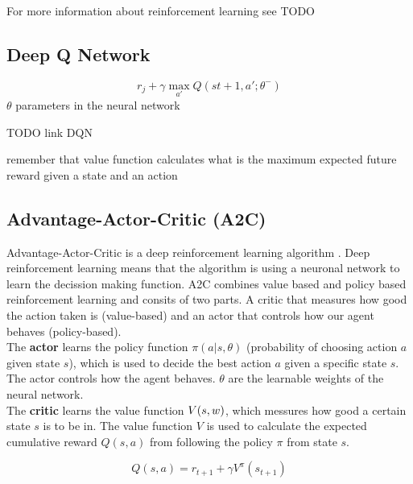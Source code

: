 For more information about reinforcement learning see TODO


\subsection{Deep Q Network}

\begin{equation}
r_j + \gamma \max_{a'} Q(s{t+1}, a'; \theta^-)
\end{equation}
$\theta$ parameters in the neural network

TODO link DQN


remember that value function calculates what is the maximum expected future reward given a state and an action
\subsection{Advantage-Actor-Critic (A2C)}
\label{sec:a2c}

Advantage-Actor-Critic is a deep reinforcement learning algorithm \cite{A3C}. Deep reinforcement learning means that the algorithm is using a neuronal network to learn the decission making function. A2C combines value based and policy based reinforcement learning and consits of two parts. A critic that measures how good the action taken is (value-based) and an actor that controls how our agent behaves (policy-based).\\

The \textbf{actor} learns the policy function $\pi(a | s, \theta)$ (probability of choosing action $a$ given state $s$), which is used to decide the best action $a$ given a specific state $s$.
The actor controls how the agent behaves.
$\theta$ are the learnable weights of the neural network. \\

The \textbf{critic} learns the value function $\mathnormal{V(s, w)}$, which messures how good a certain state $s$ is to be in. The value function $V$ is used to calculate the expected cumulative reward $Q(s, a)$ from following the policy $\pi$ from state $s$.

\begin{equation}
	Q(s, a) = r_{t+1} + \gamma V^\pi(s_{t+1})
\end{equation}

